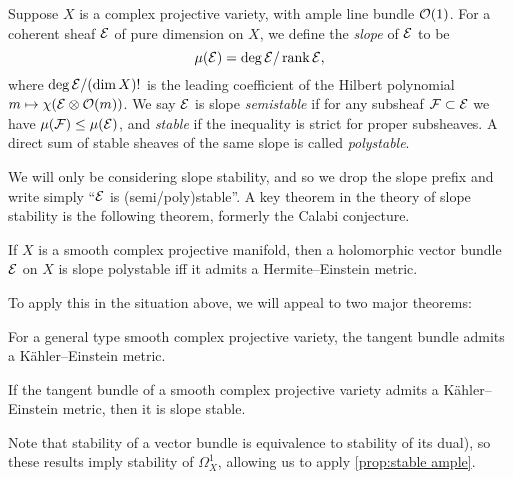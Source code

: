 \begin{definition}
    Suppose $X$ is a complex projective variety, with ample line bundle $\mathcal{O}(1)$.
    For a coherent sheaf $\mathcal{E}$ of pure dimension on $X$, we define the
    \emph{slope} of $\mathcal{E}$ to be
    \begin{equation*}
        \mu(\mathcal{E}) = \deg\mathcal{E} / \operatorname{rank}\mathcal{E},
    \end{equation*}
    where $\deg\mathcal{E}/(\dim X)!$ is the leading coefficient of the Hilbert
    polynomial $m\mapsto\chi(\mathcal{E}\otimes\mathcal{O}(m))$. We say $\mathcal{E}$ is slope
    \emph{semistable} if for any subsheaf $\mathcal{F}\subset\mathcal{E}$ we have
    $\mu(\mathcal{F})\le\mu(\mathcal{E})$, and \emph{stable} if the inequality is strict for
    proper subsheaves. A direct sum of stable sheaves of the same slope is
    called \emph{polystable}.
\end{definition}

We will only be considering slope stability, and so we drop the slope prefix and
write simply ``$\mathcal{E}$ is (semi/poly)stable''. A key theorem in the theory of
slope stability is the following theorem, formerly the Calabi conjecture.

\begin{theorem} %
    If $X$ is a smooth complex projective manifold, then a holomorphic vector
    bundle $\mathcal{E}$ on $X$ is slope polystable iff it admits a Hermite--Einstein
    metric.
\end{theorem}

To apply this in the situation above, we will appeal to two major theorems:


\begin{theorem}
    For a general type smooth complex projective variety, the tangent bundle
    admits a K\"ahler--Einstein metric.
\end{theorem}

\begin{theorem}
    If the tangent bundle of a smooth complex projective variety admits a
    K\"ahler--Einstein metric, then it is slope stable.
\end{theorem}

Note that stability of a vector bundle is equivalence to stability of its dual),
so these results imply stability of $\Omega^1_X$, allowing us to apply
\cref{prop:stable ample}.

